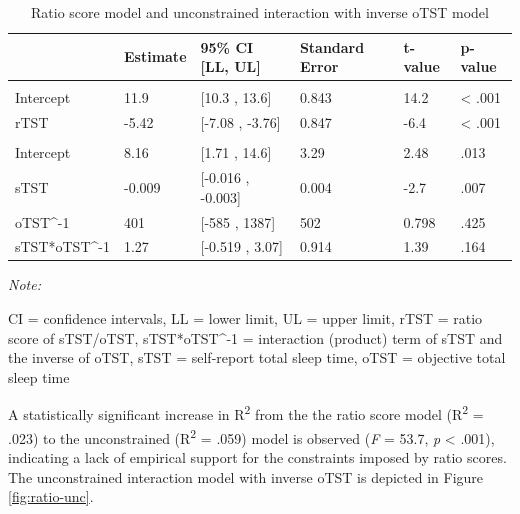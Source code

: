 \documentclass[
]{article}
\begin{document}
\begin{table}[!h]
\centering
\caption{\label{tab:ratio-tests}Ratio score model and unconstrained interaction with inverse oTST model}
\centering
\fontsize{10}{12}\selectfont
\begin{threeparttable}
\begin{tabular}[t]{llllll}
\toprule
  & Estimate & 95\% CI [LL, UL] & Standard Error & t-value & p-value\\
\midrule
\addlinespace[0.3em]
\multicolumn{6}{l}{\textbf{Ratio score model}}\\
\hspace{1em}Intercept & 11.9 & {}[10.3 , 13.6] & 0.843 & 14.2 & < .001\\
\hspace{1em}rTST & -5.42 & {}[-7.08 , -3.76] & 0.847 & -6.4 & < .001\\
\addlinespace[0.3em]
\multicolumn{6}{l}{\textbf{Unconstrained interaction model}}\\
\hspace{1em}Intercept & 8.16 & {}[1.71 , 14.6] & 3.29 & 2.48 & .013\\
\hspace{1em}sTST & -0.009 & {}[-0.016 , -0.003] & 0.004 & -2.7 & .007\\
\hspace{1em}oTST\textasciicircum{}-1 & 401 & {}[-585 , 1387] & 502 & 0.798 & .425\\
sTST*oTST\textasciicircum{}-1 & 1.27 & {}[-0.519 , 3.07] & 0.914 & 1.39 & .164\\
\bottomrule
\end{tabular}
\begin{tablenotes}[para]
\item \textit{Note: } 
\item CI = confidence intervals, LL = lower limit, UL = upper limit, rTST = ratio score of sTST/oTST, sTST*oTST\textasciicircum{}-1 = interaction (product) term of sTST and the inverse of oTST, sTST = self-report total sleep time, oTST = objective total sleep time
\end{tablenotes}
\end{threeparttable}
\end{table}

A statistically significant increase in R\textsuperscript{2} from the the ratio score model (R\textsuperscript{2} = .023) to the unconstrained (R\textsuperscript{2} = .059) model is observed (\emph{F} = 53.7, \emph{p} \textless{} .001), indicating a lack of empirical support for the constraints imposed by ratio scores. The unconstrained interaction model with inverse oTST is depicted in Figure \ref{fig:ratio-unc}.
\end{document}

